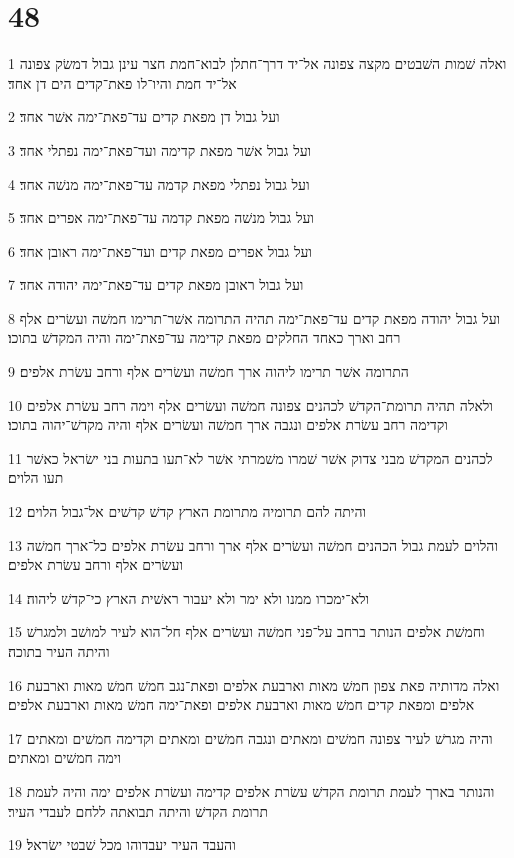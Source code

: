 \chapter{48}

\par 1 ואלה שׁמות השׁבטים מקצה צפונה אל־יד דרך־חתלן לבוא־חמת חצר עינן גבול דמשׂק צפונה אל־יד חמת והיו־לו פאת־קדים הים דן אחד׃
\par 2 ועל גבול דן מפאת קדים עד־פאת־ימה אשׁר אחד׃
\par 3 ועל גבול אשׁר מפאת קדימה ועד־פאת־ימה נפתלי אחד׃
\par 4 ועל גבול נפתלי מפאת קדמה עד־פאת־ימה מנשׁה אחד׃
\par 5 ועל גבול מנשׁה מפאת קדמה עד־פאת־ימה אפרים אחד׃
\par 6 ועל גבול אפרים מפאת קדים ועד־פאת־ימה ראובן אחד׃
\par 7 ועל גבול ראובן מפאת קדים עד־פאת־ימה יהודה אחד׃
\par 8 ועל גבול יהודה מפאת קדים עד־פאת־ימה תהיה התרומה אשׁר־תרימו חמשׁה ועשׂרים אלף רחב וארך כאחד החלקים מפאת קדימה עד־פאת־ימה והיה המקדשׁ בתוכו׃
\par 9 התרומה אשׁר תרימו ליהוה ארך חמשׁה ועשׂרים אלף ורחב עשׂרת אלפים׃
\par 10 ולאלה תהיה תרומת־הקדשׁ לכהנים צפונה חמשׁה ועשׂרים אלף וימה רחב עשׂרת אלפים וקדימה רחב עשׂרת אלפים ונגבה ארך חמשׁה ועשׂרים אלף והיה מקדשׁ־יהוה בתוכו׃
\par 11 לכהנים המקדשׁ מבני צדוק אשׁר שׁמרו משׁמרתי אשׁר לא־תעו בתעות בני ישׂראל כאשׁר תעו הלוים׃
\par 12 והיתה להם תרומיה מתרומת הארץ קדשׁ קדשׁים אל־גבול הלוים׃
\par 13 והלוים לעמת גבול הכהנים חמשׁה ועשׂרים אלף ארך ורחב עשׂרת אלפים כל־ארך חמשׁה ועשׂרים אלף ורחב עשׂרת אלפים׃
\par 14 ולא־ימכרו ממנו ולא ימר ולא יעבור ראשׁית הארץ כי־קדשׁ ליהוה׃
\par 15 וחמשׁת אלפים הנותר ברחב על־פני חמשׁה ועשׂרים אלף חל־הוא לעיר למושׁב ולמגרשׁ והיתה העיר בתוכה׃
\par 16 ואלה מדותיה פאת צפון חמשׁ מאות וארבעת אלפים ופאת־נגב חמשׁ חמשׁ מאות וארבעת אלפים ומפאת קדים חמשׁ מאות וארבעת אלפים ופאת־ימה חמשׁ מאות וארבעת אלפים׃
\par 17 והיה מגרשׁ לעיר צפונה חמשׁים ומאתים ונגבה חמשׁים ומאתים וקדימה חמשׁים ומאתים וימה חמשׁים ומאתים׃
\par 18 והנותר בארך לעמת תרומת הקדשׁ עשׂרת אלפים קדימה ועשׂרת אלפים ימה והיה לעמת תרומת הקדשׁ והיתה תבואתה ללחם לעבדי העיר׃
\par 19 והעבד העיר יעבדוהו מכל שׁבטי ישׂראל׃
